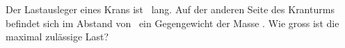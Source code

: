 Der Lastausleger eines Krans ist \aKrO\ lang. Auf der anderen Seite des Kranturms befindet sich im Abstand von \bKrO\ ein Gegengewicht der Masse \mKrO. Wie gross ist die maximal zulässige Last?
